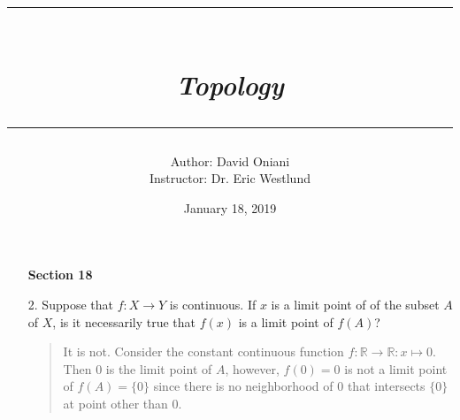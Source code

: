 \documentclass[12pt, a4paper]{article}
\title{\rule{\paperwidth - 150pt}{1pt}\textbf{\\\textit{Topology}\\}\rule{\paperwidth - 150pt}{1pt}}
\author
{
Author: David Oniani\\
Instructor: Dr. Eric Westlund
}
\date{January 18, 2019}
\newcommand{\reals}{\mathbb{R}} %
\newcommand{\rarr}{\rightarrow}
\begin{document}
\maketitle


\begin{itemize}
\item[]
\item[]
{\large \textbf{Section 18}}
\vspace{0.3cm}

\item[2.]
Suppose that $f : X \rarr Y$ is continuous. If $x$ is
a limit point of of the subset $A$ of $X$, is it necessarily
true that $f(x)$ is a limit point of $f(A)$?
\begin{quote}
It is not. Consider the constant continuous function $f : \reals \rarr \reals : x \mapsto 0$.
Then $0$ is the limit point of $A$, however, $f(0) = 0$ is not a limit point
of $f(A) = \{0\}$ since there is no neighborhood of $0$ that intersects $\{0\}$ at point other than $0$.
\end{quote}

\item[]
\item[]


\end{itemize}
\end{document}
